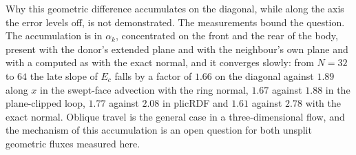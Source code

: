\documentclass[preprint,12pt]{elsarticle}
\begin{document}
Why this geometric difference accumulates on the diagonal, while along the axis the error levels off, is not demonstrated. The measurements bound the question. The accumulation is in $\alpha_k$, concentrated on the front and the rear of the body, present with the donor's extended plane and with the neighbour's own plane and with a computed as with the exact normal, and it converges slowly: from $N = 32$ to $64$ the late slope of $E_c$ falls by a factor of $1.66$ on the diagonal against $1.89$ along $x$ in the swept-face advection with the ring normal, $1.67$ against $1.88$ in the plane-clipped loop, $1.77$ against $2.08$ in plicRDF and $1.61$ against $2.78$ with the exact normal. Oblique travel is the general case in a three-dimensional flow, and the mechanism of this accumulation is an open question for both unsplit geometric fluxes measured here.
\end{document}
